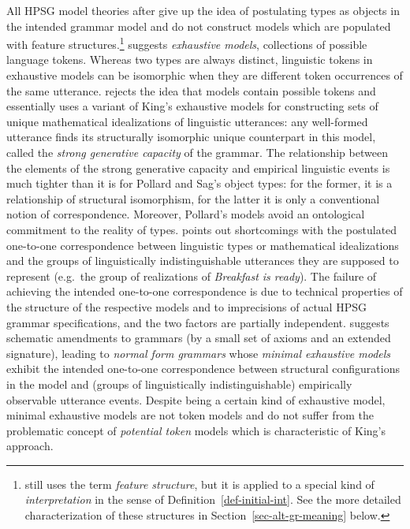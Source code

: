 \documentclass[output=paper,biblatex,babelshorthands,newtxmath,draftmode,colorlinks,citecolor=brown]{langscibook}
\begin{document}
{All HPSG model theories after  give up the idea of
postulating types as objects in the intended
grammar model and do not construct models which are populated with feature
structures.\footnote{\citet[294]{Pollard99a} still uses the term \emph{feature
    structure}, but it is applied to a special kind of \emph{interpretation}
  in the sense of Definition~\ref{def-initial-int}. See the
  more detailed characterization of these structures in
  Section~\ref{sec-alt-gr-meaning} below.} \citet{King99a-u} suggests \emph{exhaustive models},
collections of possible language tokens. Whereas two types are always
distinct, linguistic tokens in
exhaustive models can be isomorphic when they are different token
occurrences of the same utterance. \citet{Pollard99a} rejects the idea
that models contain possible tokens and essentially uses a variant of
King's exhaustive models for constructing sets of unique mathematical
idealizations of linguistic utterances: any well-formed utterance
finds its structurally isomorphic unique counterpart in this model,
called the \emph{strong generative capacity} of the grammar. The
relationship between the elements of the strong generative capacity
and empirical linguistic events is much tighter than it is for
Pollard and Sag's object types: for the former, it is a relationship
of structural isomorphism, for the latter it is only a conventional
notion of correspondence. Moreover, Pollard's models avoid an
ontological commitment to the reality of types. \citet{Richter2007a}
points out shortcomings with the postulated one-to-one correspondence
between linguistic types \citep{PollardSag1994} or mathematical
idealizations \citep{Pollard99a} and the groups of
linguistically indistinguishable utterances they
are supposed to represent (e.g.\ the group of realizations of
\emph{Breakfast is ready}). The failure of achieving the intended
one-to-one correspondence
is due to technical properties of the structure of the respective models
and to imprecisions of actual HPSG grammar
specifications, and the two factors are partially
independent. \citet{Richter2007a} suggests schematic amendments to
grammars (by a small set of axioms and an extended signature),
leading to \emph{normal form grammars} whose \emph{minimal exhaustive
  models} exhibit the intended one-to-one correspondence
between structural configurations in the model and (groups of linguistically
indistinguishable) empirically
observable utterance events. Despite being a certain kind of
exhaustive model, minimal exhaustive models are not token models and
do not suffer from the problematic concept of \emph{potential token} models
which is characteristic of King's approach.

}
\end{document}
